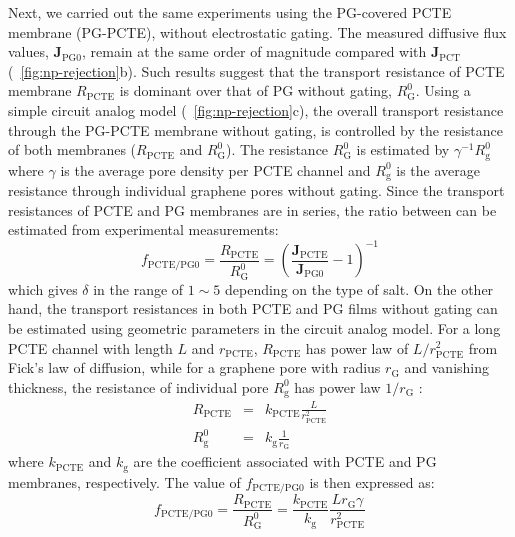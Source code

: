 Next, we carried out the same experiments using the PG-covered PCTE
membrane (PG-PCTE), without electrostatic gating. The measured
diffusive flux values, $\symbf{J}_{\mathrm{PG0}}$, remain at the same
order of magnitude compared with $\symbf{J}_{\mathrm{PCT}}$
(~\autoref{fig:np-rejection}b).
%
Such results suggest that the transport resistance of PCTE membrane
$R_{\mathrm{PCTE}}$ is dominant over that of PG without gating,
$R_{\mathrm{G}}^{0}$.
%
Using a simple circuit analog model (~\autoref{fig:np-rejection}c),
the overall transport resistance through the PG-PCTE membrane without
gating, is controlled by the resistance of both membranes
($R_{\mathrm{PCTE}}$ and $R_{\mathrm{G}}^{0}$). The resistance
$R_{\mathrm{G}}^{0}$ is estimated by $\gamma^{-1} R_{\mathrm{g}}^{0}$
where $\gamma$ is the average pore density per PCTE channel and
$R_{\mathrm{g}}^{0}$ is the average resistance through individual graphene
pores without gating.
%
Since the transport
resistances of PCTE and PG membranes are in series, the ratio between
can be estimated from experimental measurements:
\begin{equation}
  \label{eq:np-resist-ratio}
  f_{\mathrm{PCTE/PG0}} = \frac{R_{\mathrm{PCTE}}}{R_{\mathrm{G}}^{0}}
  = \left(\frac{\symbf{J}_{\mathrm{PCTE}}}{\symbf{J}_{\mathrm{PG0}}} -1 \right)^{-1}
\end{equation}%
%
which gives $\delta$ in the range of $1\sim{}5$
depending on the type of salt.
%
On the other hand, the transport resistances in both PCTE and PG films without gating can be estimated using geometric parameters in the circuit analog model.
%
For a long PCTE channel with length $L$ and $r_{\mathrm{PCTE}}$,
$R_{\mathrm{PCTE}}$ has power law of $L/r_{\mathrm{PCTE}}^{2}$ from
Fick's law of diffusion, while for a graphene pore with radius
$r_{\mathrm{G}}$ and vanishing thickness, the resistance of individual
pore $R_{\mathrm{g}}^{0}$ has power law $1/r_{\mathrm{G}}$
\autocite{O_Hern_2014_ion}:
\begin{subequations}
\begin{eqnarray}
  \label{eq:np-R-both}
  R_{\mathrm{PCTE}} &= &k_{\mathrm{PCTE}} \frac{L}{r_{\mathrm{PCTE}}^{2}} \\
  R_{\mathrm{g}}^{0} &= &k_{\mathrm{g}} \frac{1}{r_{\mathrm{G}}}
\end{eqnarray}
\end{subequations}
where $k_{\mathrm{PCTE}}$ and $k_{\mathrm{g}}$ are the coefficient
associated with PCTE and PG membranes, respectively. The value of
$f_{\mathrm{PCTE/PG0}}$ is then expressed as:
\begin{equation}
  \label{eq:np-delta-resistance}
  f_{\mathrm{PCTE/PG0}}
  = \frac{R_{\mathrm{PCTE}}}{R_{\mathrm{G}}^{0}}
  = {\displaystyle
    \frac{k_{\mathrm{PCTE}}}{k_{\mathrm{g}}}
    \frac{L r_{\mathrm{G}} \gamma}
        {r_{\mathrm{PCTE}}^{2}}}
\end{equation}
